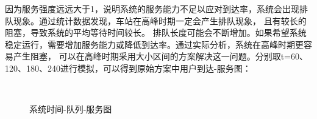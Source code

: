 因为服务强度远远大于1，说明系统的服务能力不足以应对到达率，系统会出现排队现象。通过统计数据发现，车站在高峰时期一定会产生排队现象，
且有较长的阻塞，导致系统的平均等待时间较长。
排队长度可能会不断增加。如果希望系统稳定运行，需要增加服务能力或降低到达率。通过实际分析，系统在高峰时期更容易产生阻塞，
可以在高峰时期采用大小区间的方案解决这一问题。分别取t=60、120、180、240进行模拟，可以得到原始方案中用户到达-服务图：
\begin{figure}[htbp]
    \center
    \\
    \caption{系统时间-队列-服务图}\label{fig34}
\end{figure}


